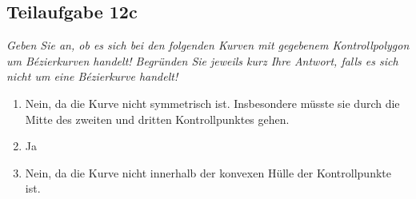 \documentclass[a4paper]{scrartcl}
\begin{document}
\subsection*{Teilaufgabe 12c}
\textit{Geben Sie an, ob es sich bei den folgenden Kurven mit gegebenem
Kontrollpolygon um Bézierkurven handelt! Begründen Sie jeweils kurz Ihre
Antwort, falls es sich nicht um eine Bézierkurve handelt!}
\begin{enumerate}
    \item Nein, da die Kurve nicht symmetrisch ist. Insbesondere müsste sie
          durch die Mitte des zweiten und dritten Kontrollpunktes gehen.
    \item Ja
    \item Nein, da die Kurve nicht innerhalb der konvexen Hülle der
          Kontrollpunkte ist.
\end{enumerate}
\end{document}
